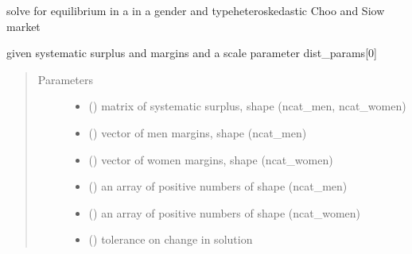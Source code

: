 \documentclass[letterpaper,10pt,english]{sphinxmanual}
\begin{document}
\begin{fulllineitems}
\label{\detokenize{ipfp_solvers:ipfp_solvers.ipfp_heteroxy_solver}}
solve for equilibrium in a  in a gender\sphinxhyphen{} and type\sphinxhyphen{}heteroskedastic Choo and Siow market

given systematic surplus and margins and a scale parameter dist\_params{[}0{]}
\begin{quote}\begin{description}
\item[{Parameters}] \leavevmode\begin{itemize}
\item {} 
 () \textendash{} matrix of systematic surplus, shape (ncat\_men, ncat\_women)

\item {} 
 () \textendash{} vector of men margins, shape (ncat\_men)

\item {} 
 () \textendash{} vector of women margins, shape (ncat\_women)

\item {} 
 () \textendash{} an array of positive numbers of shape (ncat\_men)

\item {} 
 () \textendash{} an array of positive numbers of shape (ncat\_women)

\item {} 
 () \textendash{} tolerance on change in solution


\end{itemize}
\end{description}
\end{quote}
\end{fulllineitems}
\end{document}

